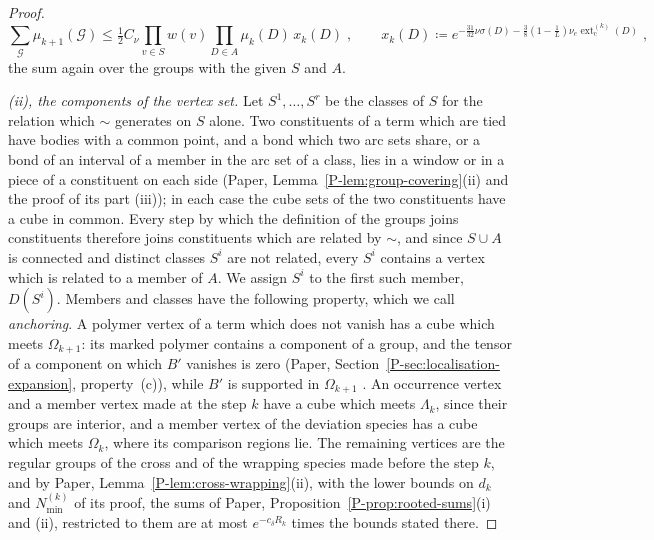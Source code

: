 \documentclass[11pt]{preprint}
\numberwithin{equation}{section}
\theoremstyle{definition}
\theoremstyle{remark}
\theoremstyle{plain}
\begin{document}
\begin{proof}
\begin{equation}\label{eq:composite-mass}
    \sum_{\mathcal G}\mu_{k+1}(\mathcal G) \leq \tfrac12C_\nu\prod_{v \in S}w(v)\prod_{D \in A}\mu_k(D)\,x_k(D)\;,
    \qquad
    x_k(D) \coloneqq e^{-\frac{31}{32}\nu\sigma(D) - \frac38(1 - \frac1L)\nu_e\operatorname{ext}^{(k)}_{\mathrm c}(D)}\;,
\end{equation}
the sum again over the groups with the given $S$ and $A$.

\emph{(ii), the components of the vertex set.} Let $S^1, \dots, S^r$ be the classes of $S$ for the relation which $\sim$ generates on $S$ alone. Two constituents of a term which are tied have bodies with a common point, and a bond which two arc sets share, or a bond of an interval of a member in the arc set of a class, lies in a window or in a piece of a constituent on each side (Paper, Lemma~\ref{P-lem:group-covering}(ii) and the proof of its part (iii)); in each case the cube sets of the two constituents have a cube in common. Every step by which the definition of the groups joins constituents therefore joins constituents which are related by $\sim$, and since $S \cup A$ is connected and distinct classes $S^i$ are not related, every $S^i$ contains a vertex which is related to a member of $A$. We assign $S^i$ to the first such member, $D(S^i)$. Members and classes have the following property, which we call \emph{anchoring}. A polymer vertex of a term which does not vanish has a cube which meets $\Omega_{k+1}$: its marked polymer contains a component of a group, and the tensor of a component on which $B'$ vanishes is zero (Paper, Section~\ref{P-sec:localisation-expansion}, property~(c)), while $B'$ is supported in $\Omega_{k+1}$ \cite[p.~276]{BalabanCRE}. An occurrence vertex and a member vertex made at the step $k$ have a cube which meets $\Lambda_k$, since their groups are interior, and a member vertex of the deviation species has a cube which meets $\Omega_k$, where its comparison regions lie. The remaining vertices are the regular groups of the cross and of the wrapping species made before the step $k$, and by Paper, Lemma~\ref{P-lem:cross-wrapping}(ii), with the lower bounds on $d_k$ and $N^{(k)}_{\min}$ of its proof, the sums of Paper, Proposition~\ref{P-prop:rooted-sums}(i) and (ii), restricted to them are at most $e^{-c_\delta R_k}$ times the bounds stated there.


\end{proof}
\end{document}
